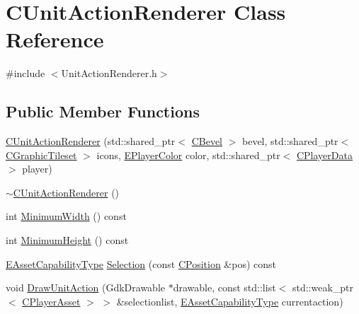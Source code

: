 \hypertarget{classCUnitActionRenderer}{}\section{C\+Unit\+Action\+Renderer Class Reference}
\label{classCUnitActionRenderer}


{\ttfamily \#include $<$Unit\+Action\+Renderer.\+h$>$}

\subsection*{Public Member Functions}
\begin{DoxyCompactItemize}
\item 
\hyperlink{classCUnitActionRenderer_abb0ea5e618b723ffc9777edf8e6cc07e}{C\+Unit\+Action\+Renderer} (std\+::shared\+\_\+ptr$<$ \hyperlink{classCBevel}{C\+Bevel} $>$ bevel, std\+::shared\+\_\+ptr$<$ \hyperlink{classCGraphicTileset}{C\+Graphic\+Tileset} $>$ icons, \hyperlink{GameDataTypes_8h_aafb0ca75933357ff28a6d7efbdd7602f}{E\+Player\+Color} color, std\+::shared\+\_\+ptr$<$ \hyperlink{classCPlayerData}{C\+Player\+Data} $>$ player)
\item 
\hyperlink{classCUnitActionRenderer_abab38d6543a121c9e34e789000ea9110}{$\sim$\+C\+Unit\+Action\+Renderer} ()
\item 
int \hyperlink{classCUnitActionRenderer_ad2d078b041fce9c34264f4670a60c7a3}{Minimum\+Width} () const
\item 
int \hyperlink{classCUnitActionRenderer_aeec570f80477cd6a3d2ec832e686f442}{Minimum\+Height} () const
\item 
\hyperlink{GameDataTypes_8h_a35b98ce26aca678b03c6f9f76e4778ce}{E\+Asset\+Capability\+Type} \hyperlink{classCUnitActionRenderer_a41108fd092035a22f7ecd75b18f045a7}{Selection} (const \hyperlink{classCPosition}{C\+Position} \&pos) const
\item 
void \hyperlink{classCUnitActionRenderer_aef690a560f7dca2c2cf9051eb4f8d71f}{Draw\+Unit\+Action} (Gdk\+Drawable $\ast$drawable, const std\+::list$<$ std\+::weak\+\_\+ptr$<$ \hyperlink{classCPlayerAsset}{C\+Player\+Asset} $>$ $>$ \&selectionlist, \hyperlink{GameDataTypes_8h_a35b98ce26aca678b03c6f9f76e4778ce}{E\+Asset\+Capability\+Type} currentaction)
\end{DoxyCompactItemize}
